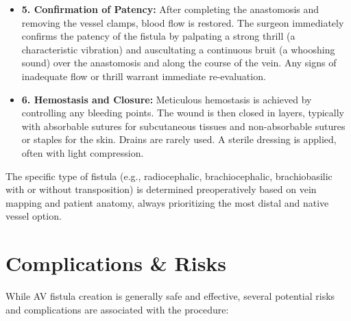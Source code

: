 \begin{itemize}
  \item \textbf{5. Confirmation of Patency:} After completing the anastomosis and removing the vessel clamps, blood flow is restored. The surgeon immediately confirms the patency of the fistula by palpating a strong thrill (a characteristic vibration) and auscultating a continuous bruit (a whooshing sound) over the anastomosis and along the course of the vein. Any signs of inadequate flow or thrill warrant immediate re-evaluation.

  \item \textbf{6. Hemostasis and Closure:} Meticulous hemostasis is achieved by controlling any bleeding points. The wound is then closed in layers, typically with absorbable sutures for subcutaneous tissues and non-absorbable sutures or staples for the skin. Drains are rarely used. A sterile dressing is applied, often with light compression.
\end{itemize}

The specific type of fistula (e.g., radiocephalic, brachiocephalic, brachiobasilic with or without transposition) is determined preoperatively based on vein mapping and patient anatomy, always prioritizing the most distal and native vessel option.

\section*{Complications \& Risks}
While AV fistula creation is generally safe and effective, several potential risks and complications are associated with the procedure:


